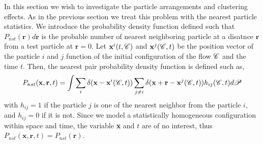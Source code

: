 In this section we wish to investigate the particle arrangements and clustering effects. 
As in the previous section we treat this problem with the nearest particle statistics.
We introduce the probability density function defined such that $P_{nst}(\textbf{r})d\textbf{r}$ is the probable number of nearest neighboring particle at a disatnce $\textbf{r}$ from a test particle at $\textbf{r} = 0$. 
Let $\textbf{x}^i(t,\mathscr{C})$ and $\textbf{x}^j(\mathscr{C},t)$ be the position vector of the particle $i$ and $j$ function of the initial configuration of the flow $\mathscr{C}$ and the time $t$. 
Then, the nearest pair probability density function is defined such as, 
\begin{equation}
    P_{nst}(\textbf{x},\textbf{r},t)= 
    \int \sum_{i}\delta(\textbf{x}-\textbf{x}^i(\mathscr{C},t))
    \sum_{j\neq i}\delta(\textbf{x}+\textbf{r}-\textbf{x}^j(\mathscr{C},t)) 
    h_{ij}(\mathscr{C},t) d\mathscr{P} 
    \label{eq:P_nstij}
\end{equation}
with $h_{ij} = 1$ if the particle $j$ is one of the nearest neighbor from the particle $i$, and $h_{ij} = 0$ if it is not. 
Since we model a statistically homogeneous configuration within space and time, the variable \textbf{x} and $t$ are of no interest, thus $P_{nst}(\textbf{x},\textbf{r},t) = P_{nst}(\textbf{r})$. 
